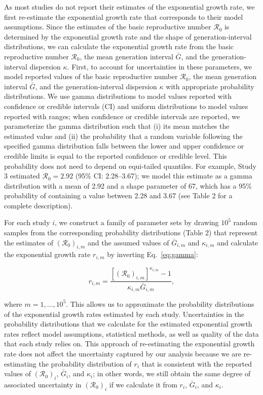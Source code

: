 \documentclass[12pt]{article}
\newcommand{\eref}[1]{Eq.~\ref{eq:#1}}
\newcommand{\Ro}{\ensuremath{{\mathcal R}_{0}}\xspace}
\begin{document}
As most studies do not report their estimates of the exponential growth rate, we first re-estimate the exponential growth rate that corresponds to their model assumptions.
Since the estimates of the basic reproductive number \Ro is determined by the exponential growth rate and the shape of generation-interval distributions, we can calculate the exponential growth rate from the basic reproductive number \Ro, the mean generation interval $\bar G$, and the generation-interval dispersion $\kappa$.
First, to account for uncertainties in these parameters, we model reported values of the basic reproductive number \Ro, the mean generation interval $\bar G$, and the generation-interval dispersion $\kappa$ with appropriate probability distributions.
We use gamma distributions to model values reported with confidence or credible intervals (CI) and uniform distributions to model values reported with ranges;
when confidence or credible intervals are reported, we parameterize the gamma distribution such that (i) its mean matches the estimated value and (ii) the probability that a random variable following the specified gamma distribution falls between the lower and upper confidence or credible limits is equal to the reported confidence or credible level. 
This probability does not need to depend on equi-tailed quantiles.
For example, Study 3 estimated $\Ro = 2.92$ (95\% CI: 2.28--3.67);
we model this estimate as a gamma distribution with a mean of 2.92 and a shape parameter of 67, which has a 95\% probability of containing a value between 2.28 and 3.67 (see Table 2 for a complete description).

For each study $i$, we construct a family of parameter sets by drawing $10^5$ random samples from the corresponding probability distributions (Table 2) that represent the estimates of $(\Ro)_{i,m}$ and the assumed values of $\bar G_{i,m}$ and $\kappa_{i,m}$ and calculate the exponential growth rate $r_{i,m}$ by inverting \eref{gamma}:
\begin{linenomath*}
\begin{equation}
r_{i,m} = \frac{\left[(\Ro)_{i,m}\right]^{\kappa_{i,m}} - 1}{\kappa_{i,m} \bar{G}_{i,m}},
\end{equation}
\end{linenomath*}
where $m=1,\dots,10^5$.
This allows us to approximate the probability distributions of the exponential growth rates estimated by each study.
Uncertainties in the probability distributions that we calculate for the estimated exponential growth rates reflect model assumptions, statistical methods, as well as quality of the data that each study relies on.
This approach of re-estimating the exponential growth rate does not affect the uncertainty captured by our analysis because we are re-estimating the probability distribution of $r_i$ that is consistent with the reported values of $(\Ro)_i$, $\bar G_i$, and $\kappa_i$;
in other words, we still obtain the same degree of associated uncertainty in $(\Ro)_i$ if we calculate it from $r_i$, $\bar G_i$, and $\kappa_i$.
\end{document}

